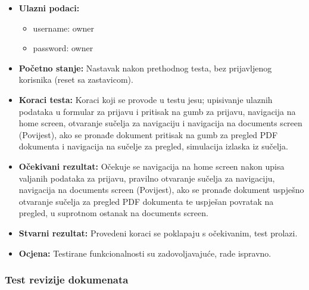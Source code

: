 			\begin{itemize}
				
				\item{\textbf{Ulazni podaci:}}
				\begin{itemize}
					\item{username: owner}
					\item{password: owner}
				\end{itemize}
				
				\item{\textbf{Početno stanje:} Nastavak nakon prethodnog testa, bez prijavljenog korisnika (reset sa zastavicom).}
				
				\item{\textbf{Koraci testa:} Koraci koji se provode u testu jesu; upisivanje ulaznih podataka u formular za prijavu i pritisak na gumb za prijavu, navigacija na home screen, otvaranje sučelja za navigaciju i navigacija na documents screen (Povijest), ako se pronađe dokument pritisak na gumb za pregled PDF dokumenta i navigacija na sučelje za pregled, simulacija izlaska iz sučelja.}
				
				\item{\textbf{Očekivani rezultat:} Očekuje se navigacija na home screen nakon upisa valjanih podataka za prijavu, pravilno otvaranje sučelja za navigaciju, navigacija na documents screen (Povijest), ako se pronađe dokument uspješno otvaranje sučelja za pregled PDF dokumenta te uspješan povratak na pregled, u suprotnom ostanak na documents screen.}
				
				\item{\textbf{Stvarni rezultat:} Provedeni koraci se poklapaju s očekivanim, test prolazi.}
				
				\item{\textbf{Ocjena:} Testirane funkcionalnosti su zadovoljavajuće, rade ispravno.}
				
			\end{itemize}
			
			\subsubsection{Test revizije dokumenata}
			
